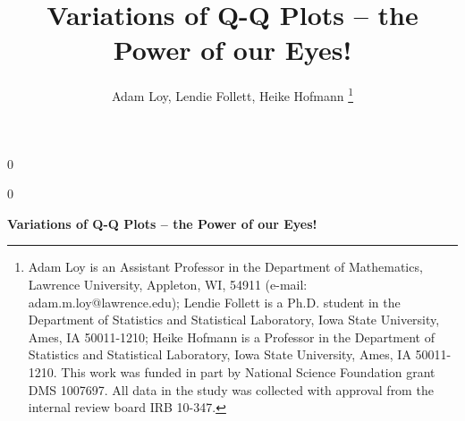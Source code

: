 \documentclass[12pt]{article}\usepackage[]{graphicx}\usepackage[]{color}
\newcommand{\blind}{0}
\begin{document}
\def\spacingset#1{\renewcommand{\baselinestretch}%
{#1}\small\normalsize} \spacingset{1}


\blind
{
  \title{\bf Variations of Q-Q Plots -- the Power of our Eyes!}
\author{Adam Loy, Lendie Follett, Heike Hofmann
\thanks{Adam Loy is an Assistant Professor in the Department of Mathematics, Lawrence University, Appleton, WI, 54911 (e-mail: adam.m.loy@lawrence.edu);  Lendie Follett is a Ph.D. student in the Department of Statistics and Statistical Laboratory, Iowa State University, Ames, IA 50011-1210; Heike Hofmann is a Professor in the Department of Statistics and Statistical Laboratory, Iowa State University, Ames, IA 50011-1210. This work was funded in part by National Science Foundation grant DMS 1007697. All data  in the study was collected  with approval from the internal review board IRB 10-347.}}
  \maketitle
} \fi

\blind
{
  \bigskip
  \bigskip
  \bigskip
  \begin{center}
    {\LARGE\bf Variations of Q-Q Plots -- the Power of our Eyes!}
\end{center}
  \medskip
} \fi


\bigskip
\end{document}
